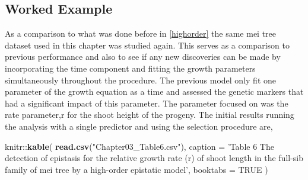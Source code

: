\documentclass[11pt,]{book}
\newenvironment{Shaded}{\begin{snugshade}}{\end{snugshade}}
\newcommand{\KeywordTok}[1]{\textcolor[rgb]{0.13,0.29,0.53}{\textbf{{#1}}}}
\newcommand{\DataTypeTok}[1]{\textcolor[rgb]{0.13,0.29,0.53}{{#1}}}
\newcommand{\StringTok}[1]{\textcolor[rgb]{0.31,0.60,0.02}{{#1}}}
\newcommand{\OtherTok}[1]{\textcolor[rgb]{0.56,0.35,0.01}{{#1}}}
\newcommand{\NormalTok}[1]{{#1}}
\theoremstyle{definition}
\theoremstyle{definition}
\theoremstyle{remark}
\begin{document}
\subsection{Worked Example}\label{worked-example-1}

As a comparison to what was done before in \ref{highorder} the same mei
tree dataset used in this chapter was studied again. This serves as a
comparison to previous performance and also to see if any new
discoveries can be made by incorporating the time component and fitting
the growth parameters simultaneously throughout the procedure. The
previous model only fit one parameter of the growth equation as a time
and assessed the genetic markers that had a significant impact of this
parameter. The parameter focused on was the rate parameter,r for the
shoot height of the progeny. The initial results running the analysis
with a single predictor and using the selection procedure are,

\begin{Shaded}
\begin{Highlighting}[]
\NormalTok{knitr::}\KeywordTok{kable}\NormalTok{(}
  \KeywordTok{read.csv}\NormalTok{(}\StringTok{"Chapter03_Table6.csv"}\NormalTok{), }\DataTypeTok{caption =} \StringTok{'Table 6 The detection of epistasis for the relative growth rate (r) of shoot length in the full-sib family of mei tree by a high-order epistatic model'}\NormalTok{,}
  \DataTypeTok{booktabs =} \OtherTok{TRUE}
\NormalTok{)}
\end{Highlighting}
\end{Shaded}
\end{document}
